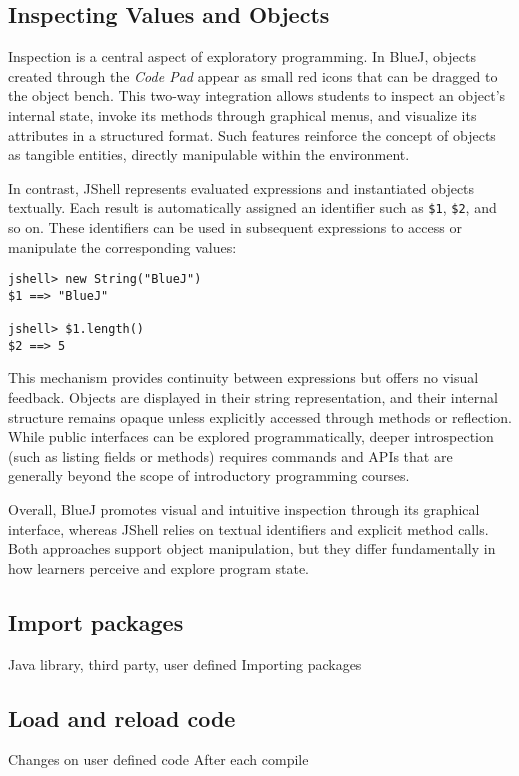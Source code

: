 \documentclass{article}
\begin{document}
\subsection{Inspecting Values and Objects}

Inspection is a central aspect of exploratory programming. In BlueJ, objects created through the \textit{Code Pad} appear as small red icons that can be dragged to the object bench. This two-way integration allows students to inspect an object’s internal state, invoke its methods through graphical menus, and visualize its attributes in a structured format. Such features reinforce the concept of objects as tangible entities, directly manipulable within the environment.

In contrast, JShell represents evaluated expressions and instantiated objects textually. Each result is automatically assigned an identifier such as \texttt{\$1}, \texttt{\$2}, and so on. These identifiers can be used in subsequent expressions to access or manipulate the corresponding values:

\begin{lstlisting}
jshell> new String("BlueJ")
$1 ==> "BlueJ"

jshell> $1.length()
$2 ==> 5
\end{lstlisting}

This mechanism provides continuity between expressions but offers no visual feedback. Objects are displayed in their string representation, and their internal structure remains opaque unless explicitly accessed through methods or reflection. While public interfaces can be explored programmatically, deeper introspection (such as listing fields or methods) requires commands and APIs that are generally beyond the scope of introductory programming courses.

Overall, BlueJ promotes visual and intuitive inspection through its graphical interface, whereas JShell relies on textual identifiers and explicit method calls. Both approaches support object manipulation, but they differ fundamentally in how learners perceive and explore program state.




\subsection{Import packages}
Java library, third party, user defined
Importing packages

\subsection{Load and reload code}
Changes on user defined code
After each compile
\end{document}
